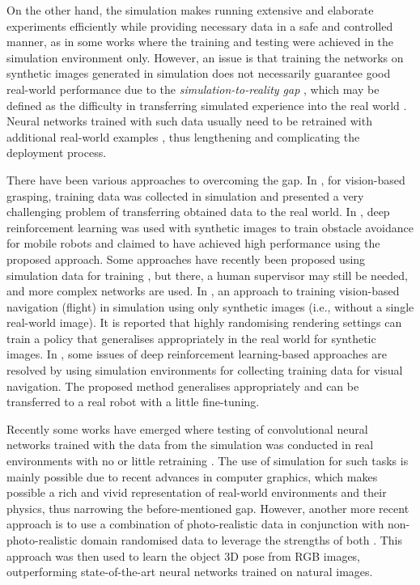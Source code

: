 On the other hand, the simulation makes running extensive and elaborate experiments efficiently while providing necessary data in a safe and controlled manner, as in some works \cite{Chen2015,Gupta2017,Mirowski2016} where the training and testing were achieved in the simulation environment only. However, an issue is that training the networks on synthetic images generated in simulation does not necessarily guarantee good real-world performance due to the \emph{simulation-to-reality gap} \cite{Bousmalis2017,Bousmalis2018}, which may be defined as the difficulty in transferring simulated experience into the real world \cite{Bousmalis2018}. Neural networks trained with such data usually need to be retrained with additional real-world examples \cite{Gandhi2017}, thus lengthening and complicating the deployment process.

There have been various approaches to overcoming the gap. In \cite{Bousmalis2018}, for vision-based grasping, training data was collected in simulation and presented a very challenging problem of transferring obtained data to the real world. In \cite{Xie2017}, deep reinforcement learning was used with synthetic images to train obstacle avoidance for mobile robots and claimed to have achieved high performance using the proposed approach. Some approaches have recently been proposed using simulation data for training \cite{Bousmalis2018,Zhu2017}, but there, a human supervisor may still be needed, and more complex networks are used. In \cite{Zhu2017}, an approach to training vision-based navigation (flight) in simulation using only synthetic images (i.e., without a single real-world image). It is reported that highly randomising rendering settings can train a policy that generalises appropriately in the real world for synthetic images. In \cite{Koenig2004}, some issues of deep reinforcement learning-based approaches are resolved by using simulation environments for collecting training data for visual navigation. The proposed method generalises appropriately and can be transferred to a real robot with a little fine-tuning.

Recently some works have emerged where testing of convolutional neural networks trained with the data from the simulation was conducted in real environments with no or little retraining \cite{Zhu2017,Sadeghi2016}. The use of simulation for such tasks is mainly possible due to recent advances in computer graphics, which makes possible a rich and vivid representation of real-world environments and their physics, thus narrowing the before-mentioned gap. However, another more recent approach is to use a combination of photo-realistic data in conjunction with non-photo-realistic domain randomised data to leverage the strengths of both \cite{Tremblay2018}. This approach was then used to learn the object 3D pose from RGB images, outperforming state-of-the-art neural networks trained on natural images.

